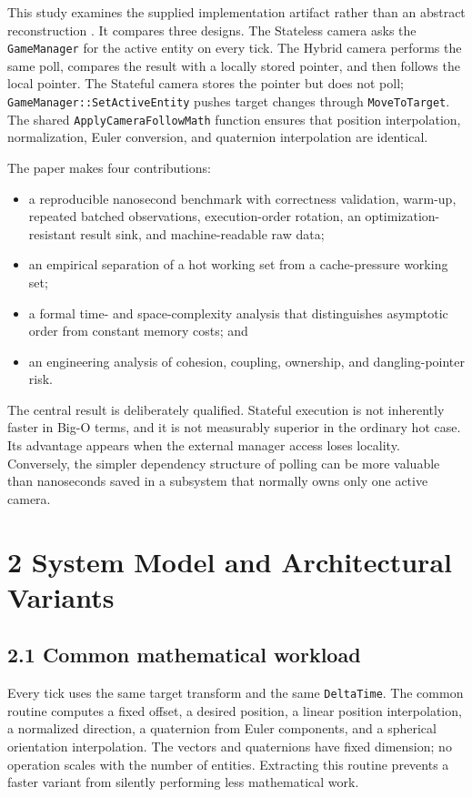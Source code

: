This study examines the supplied implementation artifact rather than an abstract reconstruction \cite{sourceartifact}. It compares three designs. The Stateless camera asks the \texttt{GameManager} for the active entity on every tick. The Hybrid camera performs the same poll, compares the result with a locally stored pointer, and then follows the local pointer. The Stateful camera stores the pointer but does not poll; \texttt{GameManager::SetActiveEntity} pushes target changes through \texttt{MoveToTarget}. The shared \texttt{ApplyCameraFollowMath} function ensures that position interpolation, normalization, Euler conversion, and quaternion interpolation are identical.

The paper makes four contributions:

\begin{itemize}
\item a reproducible nanosecond benchmark with correctness validation, warm-up, repeated batched observations, execution-order rotation, an optimization-resistant result sink, and machine-readable raw data;
\item an empirical separation of a hot working set from a cache-pressure working set;
\item a formal time- and space-complexity analysis that distinguishes asymptotic order from constant memory costs; and
\item an engineering analysis of cohesion, coupling, ownership, and dangling-pointer risk.
\end{itemize}

The central result is deliberately qualified. Stateful execution is not inherently faster in Big-O terms, and it is not measurably superior in the ordinary hot case. Its advantage appears when the external manager access loses locality. Conversely, the simpler dependency structure of polling can be more valuable than nanoseconds saved in a subsystem that normally owns only one active camera.

\section{2 System Model and Architectural Variants}

\subsection{2.1 Common mathematical workload}

Every tick uses the same target transform and the same \texttt{DeltaTime}. The common routine computes a fixed offset, a desired position, a linear position interpolation, a normalized direction, a quaternion from Euler components, and a spherical orientation interpolation. The vectors and quaternions have fixed dimension; no operation scales with the number of entities. Extracting this routine prevents a faster variant from silently performing less mathematical work.


